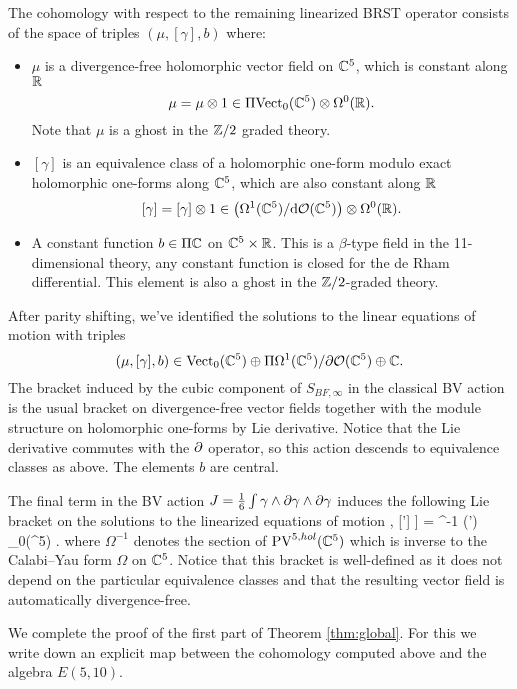 The cohomology with respect to the remaining linearized BRST operator consists of the space of triples $(\mu, [\gamma], b)$ where:
\begin{itemize}
\item $\mu$ is a divergence-free holomorphic vector field on $\mathbb C^5$, which is constant along $\mathbb R$
\[
\mu = \mu \otimes 1 \in \Pi {\rm Vect}_0(\mathbb C^5) \otimes \Omega^0(\mathbb R) .
\]
Note that $\mu$ is a ghost in the $\mathbb Z/2$ graded theory. 
\item $[\gamma]$ is an equivalence class of a holomorphic one-form modulo exact holomorphic one-forms along $\mathbb C^5$, which are also constant along $\mathbb R$
\[
[\gamma] = [\gamma] \otimes 1 \in \left(\Omega^{1}(\mathbb C^5) / {\rm d} \mathcal O(\mathbb C^5) \right) \otimes \Omega^0(\mathbb R) .
\]
\item A constant function $b \in \Pi \mathbb C$ on $\mathbb C^5 \times \mathbb R$.
This is a $\beta$-type field in the 11-dimensional theory, any constant function is closed for the de Rham differential. 
This element is also a ghost in the $\mathbb Z/2$-graded theory. 
\end{itemize}

\parsec[]

After parity shifting, we've identified the solutions to the linear equations of motion with triples
\[
(\mu, [\gamma], b) \in {\rm Vect}_0(\mathbb C^5) \oplus \Pi \Omega^{1}(\mathbb C^5) / \partial \mathcal O(\mathbb C^5) \oplus \mathbb C .
\]
The bracket induced by the cubic component of $S_{BF, \infty}$ in the classical BV action is the usual bracket on divergence-free vector fields together with the module structure on holomorphic one-forms by Lie derivative.
Notice that the Lie derivative commutes with the $\partial$ operator, so this action descends to equivalence classes as above. 
The elements $b$ are central. 

The final term in the BV action $J = \frac16\int \gamma \wedge \partial \gamma \wedge \partial \gamma$ induces the following Lie bracket on the solutions to the linearized equations of motion
\beqn\label{eqn:eqb}
\big[[\gamma], [\gamma'] \big] = \Omega^{-1} \vee (\del \gamma \wedge \del \gamma') \in \Vect_0(\CC^5) .
\eeqn
where $\Omega^{-1}$ denotes the section of ${\rm PV}^{5,hol}(\mathbb C^5)$ which is inverse to the Calabi--Yau form $\Omega$ on $\mathbb C^5$. 
Notice that this bracket is well-defined as it does not depend on the particular equivalence classes and that the resulting vector field is automatically divergence-free.

\parsec[]

We complete the proof of the first part of Theorem \ref{thm:global}. 
For this we write down an explicit map between the cohomology computed above and the algebra $E(5,10)$. 

